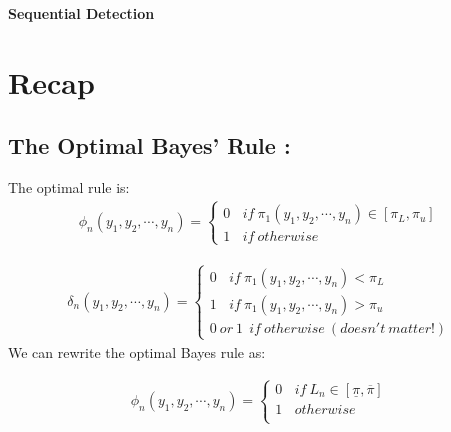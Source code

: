 \documentclass[12pt]{report}
\begin{document}
\maketitle

\begin{center}
{\Large \bf Sequential Detection}
\end{center}



\section{Recap}
\subsection{The Optimal Bayes' Rule :}
The optimal rule is:
\begin{eqnarray}
\label{l10}
\phi_n(y_1,y_2,\cdots,y_n) =  
\begin{cases}
0 \ \ \ \ if \ \pi_1(y_1,y_2,\cdots,y_n)\in[\pi_L,\pi_u] \\
1 \ \ \ \ if \ otherwise
\end{cases}
\end{eqnarray}

\begin{eqnarray}
\label{l10}
\delta_n(y_1,y_2,\cdots,y_n) =  
\begin{cases}
0 \ \ \ \ if \ \pi_1(y_1,y_2,\cdots,y_n) < \pi_L \\
1 \ \ \ \ if \ \pi_1(y_1,y_2,\cdots,y_n) > \pi_u \\
0 \ or \ 1 \ \ if \ otherwise\ (doesn't \ matter!)
\end{cases}
\end{eqnarray}
We can rewrite the optimal Bayes rule as:\newline

\begin{eqnarray}
\phi_n(y_1,y_2,\cdots,y_n) =  
\begin{cases}
0 \ \ \ \ if \ L_n\in [\underline{\pi},\overline{\pi}] \\
1 \ \ \ \ otherwise\\
\end{cases}
\end{eqnarray}
\end{document}
